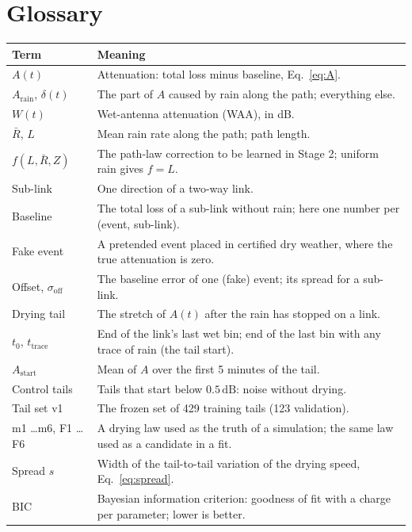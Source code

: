 \documentclass[11pt,a4paper]{article}
\newcommand{\Arain}{A_{\mathrm{rain}}}
\newcommand{\Rbar}{\bar{R}}
\newcommand{\dB}{\,\mathrm{dB}}
\newcommand{\tzero}{t_{0}}
\newcommand{\ttrace}{t_{\mathrm{trace}}}
\newcommand{\Astart}{A_{\mathrm{start}}}
\begin{document}
\appendix
\section{Glossary}

\begin{tabularx}{\linewidth}{@{}l Y@{}}
\toprule
\textbf{Term} & \textbf{Meaning} \\
\midrule
$A(t)$ & Attenuation: total loss minus baseline, Eq.~\eqref{eq:A}. \\
$\Arain$, $\delta(t)$ & The part of $A$ caused by rain along the path; everything else. \\
$W(t)$ & Wet-antenna attenuation (WAA), in dB. \\
$\Rbar$, $L$ & Mean rain rate along the path; path length. \\
$f(L,\Rbar,Z)$ & The path-law correction to be learned in Stage 2; uniform rain gives $f = L$. \\
Sub-link & One direction of a two-way link. \\
Baseline & The total loss of a sub-link without rain; here one number per (event, sub-link). \\
Fake event & A pretended event placed in certified dry weather, where the true attenuation is zero. \\
Offset, $\sigma_{\mathrm{off}}$ & The baseline error of one (fake) event; its spread for a sub-link. \\
Drying tail & The stretch of $A(t)$ after the rain has stopped on a link. \\
$\tzero$, $\ttrace$ & End of the link's last wet bin; end of the last bin with any trace of rain (the tail start). \\
$\Astart$ & Mean of $A$ over the first 5 minutes of the tail. \\
Control tails & Tails that start below $0.5\dB$: noise without drying. \\
Tail set v1 & The frozen set of 429 training tails (123 validation). \\
m1 \ldots m6, F1 \ldots F6 & A drying law used as the truth of a simulation; the same law used as a candidate in a fit. \\
Spread $s$ & Width of the tail-to-tail variation of the drying speed, Eq.~\eqref{eq:spread}. \\
BIC & Bayesian information criterion: goodness of fit with a charge per parameter; lower is better. \\

\end{tabularx}
\end{document}
